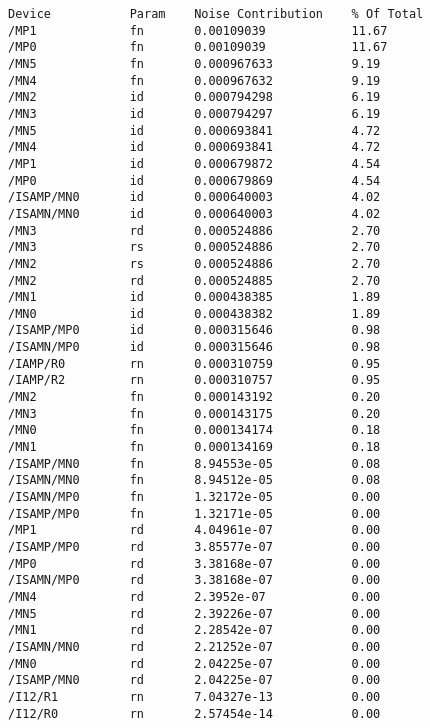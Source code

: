 {\small
\begin{verbatim}
Device           Param    Noise Contribution    % Of Total
/MP1             fn       0.00109039            11.67     
/MP0             fn       0.00109039            11.67     
/MN5             fn       0.000967633           9.19      
/MN4             fn       0.000967632           9.19      
/MN2             id       0.000794298           6.19      
/MN3             id       0.000794297           6.19      
/MN5             id       0.000693841           4.72      
/MN4             id       0.000693841           4.72      
/MP1             id       0.000679872           4.54      
/MP0             id       0.000679869           4.54      
/ISAMP/MN0       id       0.000640003           4.02      
/ISAMN/MN0       id       0.000640003           4.02      
/MN3             rd       0.000524886           2.70      
/MN3             rs       0.000524886           2.70      
/MN2             rs       0.000524886           2.70      
/MN2             rd       0.000524885           2.70      
/MN1             id       0.000438385           1.89      
/MN0             id       0.000438382           1.89      
/ISAMP/MP0       id       0.000315646           0.98      
/ISAMN/MP0       id       0.000315646           0.98      
/IAMP/R0         rn       0.000310759           0.95      
/IAMP/R2         rn       0.000310757           0.95      
/MN2             fn       0.000143192           0.20      
/MN3             fn       0.000143175           0.20      
/MN0             fn       0.000134174           0.18      
/MN1             fn       0.000134169           0.18      
/ISAMP/MN0       fn       8.94553e-05           0.08      
/ISAMN/MN0       fn       8.94512e-05           0.08      
/ISAMN/MP0       fn       1.32172e-05           0.00      
/ISAMP/MP0       fn       1.32171e-05           0.00      
/MP1             rd       4.04961e-07           0.00      
/ISAMP/MP0       rd       3.85577e-07           0.00      
/MP0             rd       3.38168e-07           0.00      
/ISAMN/MP0       rd       3.38168e-07           0.00      
/MN4             rd       2.3952e-07            0.00      
/MN5             rd       2.39226e-07           0.00      
/MN1             rd       2.28542e-07           0.00      
/ISAMN/MN0       rd       2.21252e-07           0.00      
/MN0             rd       2.04225e-07           0.00      
/ISAMP/MN0       rd       2.04225e-07           0.00      
/I12/R1          rn       7.04327e-13           0.00      
/I12/R0          rn       2.57454e-14           0.00      

\end{verbatim}}
